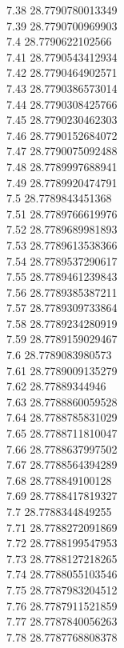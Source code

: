 {7.38	28.7790780013349\\
7.39	28.7790700969903\\
7.4	28.7790622102566\\
7.41	28.7790543412934\\
7.42	28.7790464902571\\
7.43	28.7790386573014\\
7.44	28.7790308425766\\
7.45	28.7790230462303\\
7.46	28.7790152684072\\
7.47	28.7790075092488\\
7.48	28.7789997688941\\
7.49	28.7789920474791\\
7.5	28.7789843451368\\
7.51	28.7789766619976\\
7.52	28.7789689981893\\
7.53	28.7789613538366\\
7.54	28.7789537290617\\
7.55	28.7789461239843\\
7.56	28.7789385387211\\
7.57	28.7789309733864\\
7.58	28.7789234280919\\
7.59	28.7789159029467\\
7.6	28.7789083980573\\
7.61	28.7789009135279\\
7.62	28.77889344946\\
7.63	28.7788860059528\\
7.64	28.7788785831029\\
7.65	28.7788711810047\\
7.66	28.7788637997502\\
7.67	28.7788564394289\\
7.68	28.778849100128\\
7.69	28.7788417819327\\
7.7	28.7788344849255\\
7.71	28.7788272091869\\
7.72	28.7788199547953\\
7.73	28.7788127218265\\
7.74	28.7788055103546\\
7.75	28.7787983204512\\
7.76	28.7787911521859\\
7.77	28.7787840056263\\
7.78	28.7787768808378\\
}
